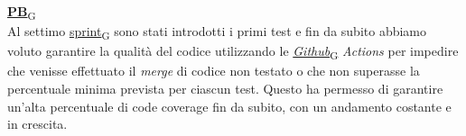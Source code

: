 \begin{flushleft}
\href{https://7last.github.io/docs/pb/documentazione-interna/glossario\#product-baseline}{\textbf{PB}\textsubscript{G}} \\
Al settimo \href{https://7last.github.io/docs/pb/documentazione-interna/glossario\#sprint}{sprint\textsubscript{G}} sono stati introdotti i primi test e fin da subito abbiamo voluto garantire la qualità del codice utilizzando le \href{https://7last.github.io/docs/pb/documentazione-interna/glossario\#github}{\textit{Github}\textsubscript{G}}\textit{ Actions} per impedire che venisse effettuato il \textit{merge} di codice non testato o che non superasse la percentuale minima prevista per ciascun test. Questo ha permesso di garantire un'alta percentuale di code coverage fin da subito, con un andamento costante e in crescita.
\end{flushleft}

\newpage
